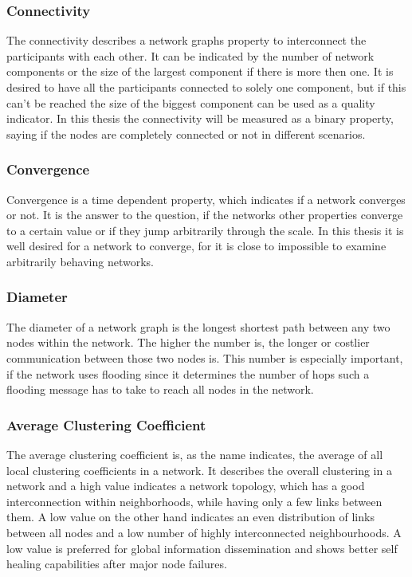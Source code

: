 \subsubsection{Connectivity}
The connectivity describes a network graphs property to interconnect the
participants with each other. It can be indicated by the number of network
components or the size of the largest component if there is more then one. It is
desired to have all the participants connected to solely one component, but if
this can't be reached the size of the biggest component can be used as a quality
indicator. In this thesis the connectivity will be measured as a binary
property, saying if the nodes are completely connected or not in different
scenarios.
\subsubsection{Convergence}
Convergence is a time dependent property, which indicates if a network converges
or not. It is the answer to the question, if the networks other properties
converge to a certain value or if they jump arbitrarily through the scale.
In this thesis it is well desired for a network to converge, for it is close to
impossible to examine arbitrarily behaving networks.

\subsubsection{Diameter}
The diameter of a network graph is the longest shortest path between any two
nodes within the network. The higher the number is, the longer or costlier
communication between those two nodes is. This number is especially important,
if the network uses flooding since it determines the number of hops such a
flooding message has to take to reach all nodes in the network. 

\subsubsection{Average Clustering Coefficient}
The average clustering coefficient \cite{watts1998collective} is, as the name
indicates,  the average of all local clustering coefficients in a network. It
describes the overall clustering in a network and a high value indicates a
network topology, which has a good interconnection within neighborhoods, while
having only a few links between them. A low value on the other hand indicates an
even distribution of links between all nodes and a low number of highly
interconnected neighbourhoods. A low value is preferred for global information
dissemination and shows better self healing capabilities after major node
failures.
